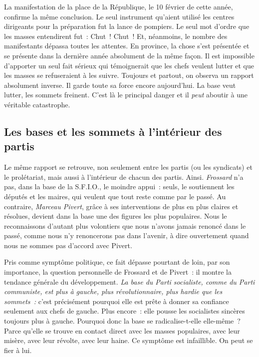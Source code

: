 \documentclass[french,twoside]{book} %
\begin{document}
La manifestation de la place de la République, le 10 février de cette année, confirme la même conclusion. Le seul instrument qu’aient utilisé les centres dirigeants pour la préparation fut la lance de pompiers. Le seul mot d’ordre que les masses entendirent fut : Chut ! Chut ! Et, néanmoins, le nombre des manifestants dépassa toutes les attentes. En province, la chose s’est présentée et se présente dans la dernière année absolument de la même  façon. Il est impossible d’apporter un seul fait sérieux qui témoignerait que les chefs veulent lutter et que les masses se refuseraient à les suivre. Toujours et partout, on observa un rapport absolument inverse. Il garde toute sa force encore aujourd’hui. La base veut lutter, les sommets freinent. C’est là le principal danger et il \emph{peut} aboutir à une véritable catastrophe.
\subsection[{Les bases et les sommets à l’intérieur des partis}]{Les bases et les sommets à l’intérieur des partis}
\noindent Le même rapport se retrouve, non seulement entre les partis (ou les syndicats) et le prolétariat, mais aussi à l’intérieur de chacun des partis. Ainsi. \emph{Frossard} n’a pas, dans la base de la S.F.I.O., le moindre appui : seuls, le soutiennent les députés et les maires, qui veulent que tout reste comme par le passé. Au contraire, \emph{Marceau Pivert}, grâce à ses interventions de plus en plus claires et résolues, devient dans la base une des figures les plus populaires. Nous le reconnaissons d’autant plus volontiers que nous n’avons jamais renoncé dans le passé, comme nous n’y renoncerons pas dans l’avenir, à dire ouvertement quand nous ne sommes pas d’accord avec Pivert.\par
Pris comme symptôme politique, ce fait dépasse pourtant de loin, par son importance, la question personnelle de Frossard et de Pivert : il montre la tendance générale du développement. \emph{La base du Parti socialiste, comme du Parti communiste, est plus à gauche, plus révolutionnaire, plus hardie que les sommets :} c’est précisément pourquoi elle est prête à donner sa confiance seulement aux chefs de gauche. Plus encore : elle pousse les socialistes sincères toujours plus à gauche. Pourquoi donc la base se radicalise-t-elle elle-même ? Parce qu’elle se trouve en contact direct avec les masses populaires, avec leur misère, avec leur révolte, avec leur haine. Ce symptôme est infaillible. On peut se fier à lui.
\end{document}
